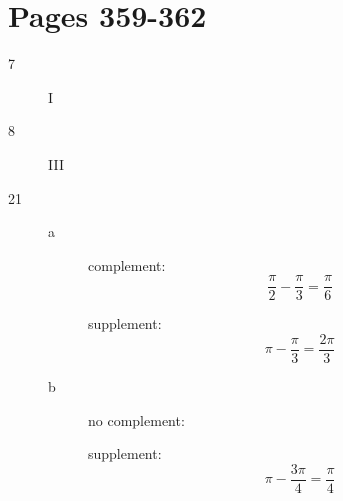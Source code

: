 \documentclass[fleqn,addpoints]{exam}
\begin{document}
\ifprintanswers
\section{Pages 359-362}

\begin{description}
\item[7]
I

\item[8]
III







\item[21]
\begin{description}
\item[a]
complement:
\[
  \frac{\pi}{2} - \frac{\pi}{3} = \frac{\pi}{6}
\]

supplement:
\[
  \pi - \frac{\pi}{3} = \frac{2 \pi}{3}
\]

\item[b]
no complement:

supplement:
\[
  \pi - \frac{3 \pi}{4} = \frac{\pi}{4}
\]



\end{description}
\end{description}
\end{document}
